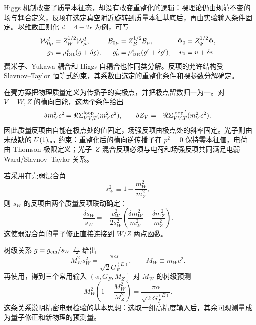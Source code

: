 Higgs 机制改变了质量本征态，却没有改变重整化的逻辑：裸理论仍由规范不变的场与耦合定义，反项在选定真空附近旋转到质量本征基底后，再由实验输入条件固定。以维数正则化 $d=4-2\epsilon$ 为例，可写
\begin{align*}
\mathcal W_{0\mu}^I&=Z_W^{1/2}\mathcal W_\mu^I,
&\mathcal B_{0\mu}&=Z_B^{1/2}\mathcal B_\mu,
&\Phi_0&=Z_\Phi^{1/2}\Phi,\\
g_0&=\mu_{\rm DR}^{\epsilon}(g+\delta g),
&g_0'&=\mu_{\rm DR}^{\epsilon}(g'+\delta g'),
&v_0&=v+\delta v.
\end{align*}
费米子、Yukawa 耦合和 Higgs 自耦合也作同类分解。反项的允许结构受 Slavnov--Taylor 恒等式约束，其系数由选定的重整化条件和裸参数分解确定。

在壳方案把物理质量定义为传播子的实极点，并把极点留数归一为一。对 $V=W,Z$ 的横向自能，这两个条件给出
\begin{equation}
\delta m_V^2c^2
=\Re\Sigma_{VV,T}^{\rm loop}(m_V^2c^2),
\qquad
\delta Z_V
=-\Re\Sigma_{VV,T}^{{\rm loop}\,'}(m_V^2c^2).
\label{eq:ew-onshell-mass-field-ct-dp11}
\end{equation}
因此质量反项由自能在极点处的值固定，场强反项由极点处的斜率固定。光子则由未破缺的 $U(1)_{\rm em}$ 约束：重整化后的横向逆传播子在 $p^2=0$ 保持零本征值，电荷由 Thomson 极限定义；光子--$Z$ 混合反项必须与电荷和场强反项共同满足电弱 Ward/Slavnov--Taylor 关系。

若采用在壳弱混合角
\begin{equation}
s_W^2\equiv1-\frac{m_W^2}{m_Z^2},
\label{eq:onshell-sw-definition-dp11}
\end{equation}
则 $s_W$ 的反项由两个质量反项联动确定：
\begin{equation}
{
\frac{\delta s_W}{s_W}
=-\frac{c_W^2}{2s_W^2}
\left(\frac{\delta m_W^2}{m_W^2}
-\frac{\delta m_Z^2}{m_Z^2}\right).}
\label{eq:sw-counterterm-massrelation-dp11}
\end{equation}
这使弱混合角的量子修正直接连接到 $W/Z$ 两点函数。

树级关系 $g=g_{\rm em}/s_W$ 与 给出
\begin{equation*}
M_W^2s_W^2=\frac{\pi\alpha}{\sqrt2G_F^{(E)}},
\qquad M_W\equiv m_Wc^2.
\end{equation*}
再使用，得到三个常用输入 $(\alpha,G_F,M_Z)$ 对 $M_W$ 的树级预测
\begin{equation}
{
M_W^2\left(1-\frac{M_W^2}{M_Z^2}\right)
=\frac{\pi\alpha}{\sqrt2G_F^{(E)}}.}
\label{eq:mw-mz-alpha-gf-tree-dp11}
\end{equation}
这条关系说明精密电弱检验的基本思想：选取一组高精度输入后，其余可观测量成为量子修正和新物理的预测量。

